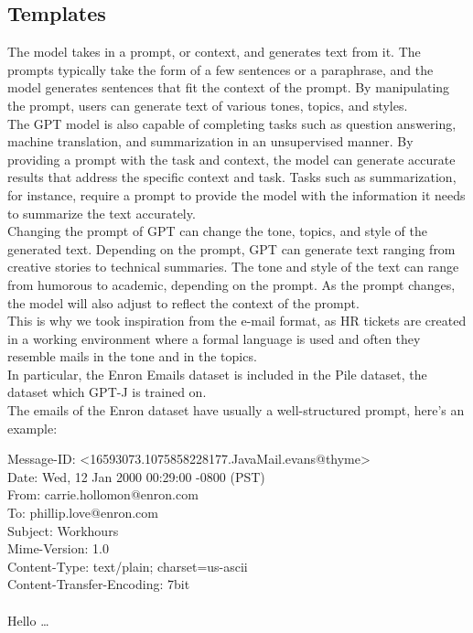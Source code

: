 \subsection*{Templates}
The model takes in a prompt, or context, and generates text from it. The prompts typically take the form of a few sentences or a paraphrase, and the model generates sentences that fit the context of the prompt. By manipulating the prompt, users can generate text of various tones, topics, and styles. \\
The GPT model is also capable of completing tasks such as question answering, machine translation, and summarization in an unsupervised manner\cite{radford2019language}. By providing a prompt with the task and context, the model can generate accurate results that address the specific context and task. Tasks such as summarization, for instance, require a prompt to provide the model with the information it needs to summarize the text accurately. \\
Changing the prompt of GPT can change the tone, topics, and style of the generated text. Depending on the prompt, GPT can generate text ranging from creative stories to technical summaries. The tone and style of the text can range from humorous to academic, depending on the prompt. As the prompt changes, the model will also adjust to reflect the context of the prompt. \\
This is why we took inspiration from the e-mail format, as HR tickets are created in a working environment where a formal language is used and often they resemble mails in the tone and in the topics. \\
In particular, the Enron Emails dataset is included in the Pile dataset, the dataset which GPT-J is trained on. \\
The emails of the Enron dataset have usually a well-structured prompt, here's an example: 
\begin{adjustwidth}{1cm}{}
    Message-ID: <16593073.1075858228177.JavaMail.evans@thyme>\\
    Date: Wed, 12 Jan 2000 00:29:00 -0800 (PST) \\
    From: carrie.hollomon@enron.com\\
    To: phillip.love@enron.com\\
    Subject: Workhours\\
    Mime-Version: 1.0\\
    Content-Type: text/plain; charset=us-ascii\\
    Content-Transfer-Encoding: 7bit\\\\
    Hello \dots
\end{adjustwidth}
